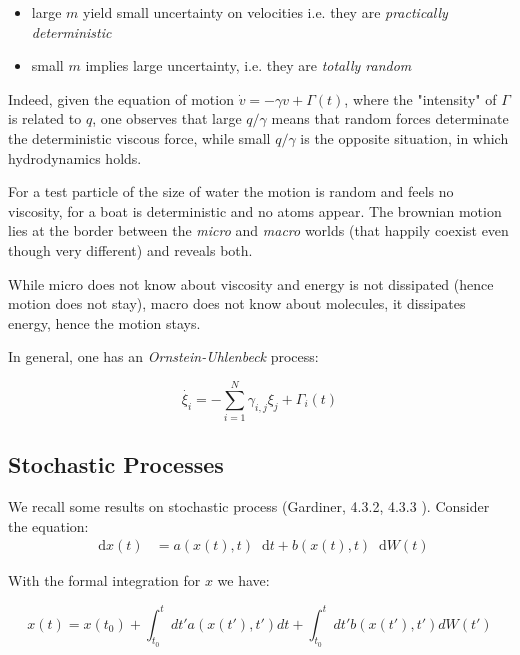 \documentclass{article}
\newcommand*\diff{\mathop{}\!\mathrm{d}}
\begin{document}
\begin{itemize}

\item large $m$ yield small uncertainty on velocities i.e. they are \textit{practically deterministic}

\item small $m$ implies large uncertainty, i.e. they are \textit{totally random}
\end{itemize}

Indeed, given the equation of motion $\dot{v} = - \gamma v + \Gamma(t)$, where the "intensity" of $\Gamma$ is related to $	q$, one observes that large $q/ \gamma$ means that random forces determinate the deterministic viscous force, while small $q/ \gamma$ is the opposite situation, in which hydrodynamics holds. 

For a test particle of the size of water the motion is random and feels no viscosity, for a boat is deterministic and no atoms appear. The brownian motion lies at the border between the \textit{micro} and \textit{macro} worlds (that happily coexist even though very different) and reveals both.

While micro does not know about viscosity and energy is not dissipated (hence motion does not stay), macro does not know about molecules, it dissipates energy, hence the motion stays.

In general, one has an \textit{Ornstein-Uhlenbeck} process:

\begin{equation}
\dot{ \xi_i} = - \sum_{i=1}^{N} \gamma_{i,j} \xi_j + \Gamma_i(t)
\end{equation}

\newpage
\subsection{Stochastic Processes}

We recall some results on stochastic process (Gardiner, 4.3.2, 4.3.3 ).
Consider the equation:
\begin{align*}
\diff x(t) & = a(x(t),t) \diff t+b(x(t),t) \diff W(t) 
\end{align*}

With the formal integration for $x$ we have:

\begin{equation}
x(t) = x(t_0) + \int_{t_0}^{t} dt' a(x(t'),t')dt+ \int_{t_0}^{t} dt' b(x(t'),t')dW(t')
\end{equation}
\end{document}
